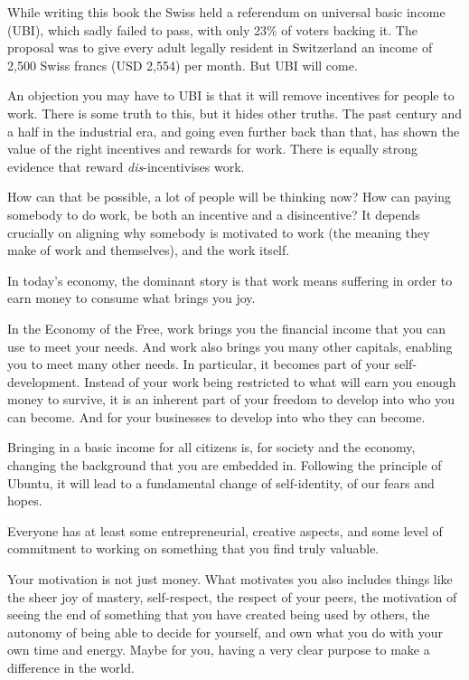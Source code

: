 While writing this book the Swiss held a referendum on universal basic income (UBI), which sadly failed to pass, with only 23\% of voters backing it. The proposal was to give every adult legally resident in Switzerland an income of 2,500 Swiss francs (USD 2,554) per month. But UBI will come.


An objection you may have to UBI is that it will remove incentives for people to work. There is some truth to this, but it hides other truths. The past century and a half in the industrial era, and going even further back than that, has shown the value of the right incentives and rewards for work. There is equally strong evidence that reward \emph{dis}-incentivises work.


How can that be possible, a lot of people will be thinking now? How can paying somebody to do work, be both an incentive and a disincentive? It depends crucially on aligning why somebody is motivated to work (the meaning they make of work and themselves), and the work itself.


In today's economy, the dominant story is that work means suffering in order to earn money to consume what brings you joy. 


In the Economy of the Free, work brings you the financial income that you can use to meet your needs. And work also brings you many other capitals, enabling you to meet many other needs. In particular, it becomes part of your self-development. Instead of your work being restricted to what will earn you enough money to survive, it is an inherent part of your freedom to develop into who you can become. And for your businesses to develop into who they can become.


Bringing in a basic income for all citizens is, for society and the economy, changing the background that you are embedded in. Following the principle of Ubuntu, it will lead to a fundamental change of self-identity, of our fears and hopes.


Everyone has at least some entrepreneurial, creative aspects, and some level of commitment to working on something that you find truly valuable. 


Your motivation is not just money. What motivates you also includes things like the sheer joy of mastery, self-respect, the respect of your peers, the motivation of seeing the end of something that you have created being used by others, the autonomy of being able to decide for yourself, and own what you do with your own time and energy. Maybe for you, having a very clear purpose to make a difference in the world.


